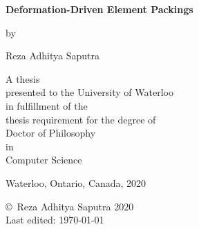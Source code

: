 \pagestyle{empty}

\begin{titlepage}
        \begin{center}
        \vspace*{1.0cm}

        \Huge
        {\bf Deformation-Driven Element Packings }

        \vspace*{1.0cm}

        \normalsize
        by \\

        \vspace*{1.0cm}

        \Large
        Reza Adhitya Saputra \\

        \vspace*{3.0cm}

        \normalsize
        A thesis \\
        presented to the University of Waterloo \\ 
        in fulfillment of the \\
        thesis requirement for the degree of \\
        Doctor of Philosophy \\
        in \\
        Computer Science \\

        \vspace*{2.0cm}

        Waterloo, Ontario, Canada, 2020 \\

        \vspace*{1.0cm}

        \copyright\ Reza Adhitya Saputra 2020 \\


        
        Last edited: \today \;\; \currenttime

        \end{center}



\end{titlepage}

